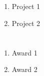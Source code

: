 \section*{\cvprojects}
\begin{enumerate}
\item Project 1
\item Project 2
\end{enumerate}


\section*{\cvawards}
\begin{enumerate}
\item Award 1
\item Award 2
\end{enumerate}